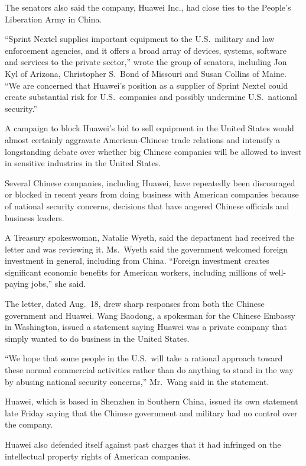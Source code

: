 ﻿\documentclass[12pt]{article}
\begin{document}
The senators also said the company, Huawei Inc., had close ties to the People's Liberation Army in
China.

``Sprint Nextel supplies important equipment to the U.S.~military and law enforcement agencies, and
it offers a broad array of devices, systems, software and services to the private sector,'' wrote
the group of senators, including Jon Kyl of Arizona, Christopher S.~Bond of Missouri and Susan
Collins of Maine. ``We are concerned that Huawei's position as a supplier of Sprint Nextel could
create substantial risk for U.S.~companies and possibly undermine U.S.~national security.''

A campaign to block Huawei's bid to sell equipment in the United States would almost certainly
aggravate American-Chinese trade relations and intensify a longstanding debate over whether big
Chinese companies will be allowed to invest in sensitive industries in the United States.

Several Chinese companies, including Huawei, have repeatedly been discouraged or blocked in recent
years from doing business with American companies because of national security concerns, decisions
that have angered Chinese officials and business leaders.

A Treasury spokeswoman, Natalie Wyeth, said the department had received the letter and was reviewing
it. Ms.~Wyeth said the government welcomed foreign investment in general, including from China.
``Foreign investment creates significant economic benefits for American workers, including millions
of well-paying jobs,'' she said.

The letter, dated Aug.~18, drew sharp responses from both the Chinese government and Huawei. Wang
Baodong, a spokesman for the Chinese Embassy in Washington, issued a statement saying Huawei was a
private company that simply wanted to do business in the United States.

``We hope that some people in the U.S.~will take a rational approach toward these normal commercial
activities rather than do anything to stand in the way by abusing national security concerns,''
Mr.~Wang said in the statement.

Huawei, which is based in Shenzhen in Southern China, issued its own statement late Friday saying
that the Chinese government and military had no control over the company.

Huawei also defended itself against past charges that it had infringed on the intellectual property
rights of American companies.
\end{document}
